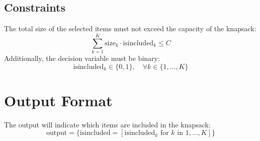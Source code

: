 \documentclass{article}
\begin{document}
\subsection{Constraints}
The total size of the selected items must not exceed the capacity of the knapsack:
\[
\sum_{k=1}^{K} \text{size}_{k} \cdot \text{isincluded}_{k} \leq C
\]
Additionally, the decision variable must be binary:
\[
\text{isincluded}_{k} \in \{0, 1\}, \quad \forall k \in \{1, \ldots, K\}
\]

\section{Output Format}
The output will indicate which items are included in the knapsack:
\[
\text{output} = \{ \text{isincluded} = [\text{isincluded}_{k} \text{ for } k \text{ in } 1,\ldots,K] \}
\]
\end{document}
